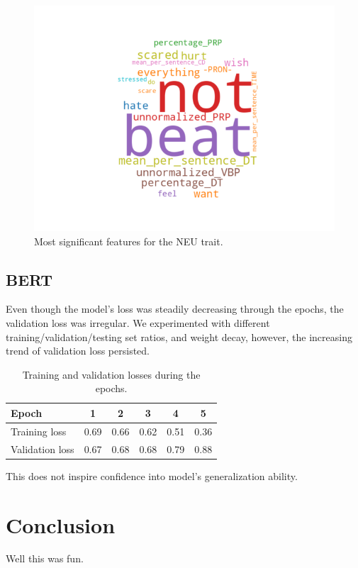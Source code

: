 \documentclass[10pt, a4paper]{article}
\begin{document}
\begin{figure}
\begin{center}
  \includegraphics[width=\columnwidth]{figures/cNEU.png}
  \caption{Most significant features for the NEU trait.}
  \label{fig:figure5}
\end{center}
\end{figure}

\subsection{BERT}

Even though the model's loss was steadily decreasing through the epochs, the validation loss was irregular. 
We experimented with different training/validation/testing set ratios, and weight decay, however, the increasing trend of validation loss persisted. 

\begin{table}[H]
	\begin{tabular}{|l|c|c|c|c|c|}
    \hline
    Epoch & 1 & 2 & 3 & 4 & 5\\
		\hline
		Training loss & 0.69 & 0.66 & 0.62 & 0.51 & 0.36\\ 
    \hline
		Validation loss & 0.67 & 0.68 & 0.68 & 0.79 & 0.88\\ 
    \hline
	\end{tabular}
	\caption{Training and validation losses during the epochs.}
	\label{losses}
\end{table}

This does not inspire confidence into model's generalization ability.

\section{Conclusion}
Well this was fun.



\end{document}
